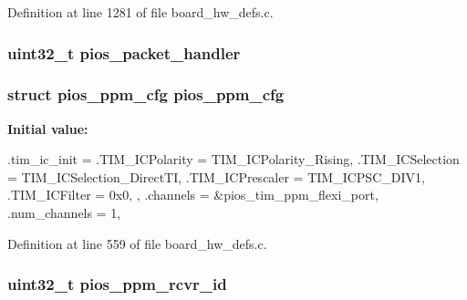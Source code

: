 \-Definition at line 1281 of file board\-\_\-hw\-\_\-defs.\-c.

\hypertarget{group___pip_xtreme_gab0199d5aedb7be35cb1d6880ee21f8ac}{
\subsubsection[{pios\-\_\-packet\-\_\-handler}]{\setlength{\rightskip}{0pt plus 5cm}uint32\-\_\-t {\bf pios\-\_\-packet\-\_\-handler}}}\label{group___pip_xtreme_gab0199d5aedb7be35cb1d6880ee21f8ac}
\hypertarget{group___pip_xtreme_ga256c8c512691a72ee2ed15d1a9041810}{
\subsubsection[{pios\-\_\-ppm\-\_\-cfg}]{\setlength{\rightskip}{0pt plus 5cm}struct {\bf pios\-\_\-ppm\-\_\-cfg} {\bf pios\-\_\-ppm\-\_\-cfg}}}\label{group___pip_xtreme_ga256c8c512691a72ee2ed15d1a9041810}
{\bfseries \-Initial value\-:}
\begin{DoxyCode}
 {
        .tim_ic_init = {
                .TIM_ICPolarity = TIM_ICPolarity_Rising,
                .TIM_ICSelection = TIM_ICSelection_DirectTI,
                .TIM_ICPrescaler = TIM_ICPSC_DIV1,
                .TIM_ICFilter = 0x0,
        },
        .channels = &pios_tim_ppm_flexi_port,
        .num_channels = 1,
}
\end{DoxyCode}


\-Definition at line 559 of file board\-\_\-hw\-\_\-defs.\-c.

\hypertarget{group___pip_xtreme_ga6338d4e922eaddddb7e8cb253a901907}{
\subsubsection[{pios\-\_\-ppm\-\_\-rcvr\-\_\-id}]{\setlength{\rightskip}{0pt plus 5cm}uint32\-\_\-t {\bf pios\-\_\-ppm\-\_\-rcvr\-\_\-id}}}\label{group___pip_xtreme_ga6338d4e922eaddddb7e8cb253a901907}


